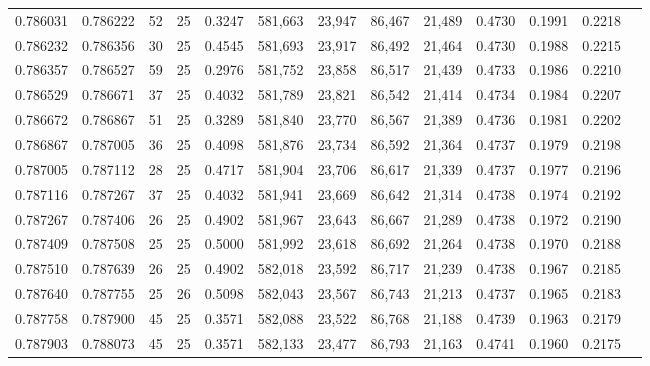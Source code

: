 \begin{tabular}{rrrrrrrrrrrrr}
0.786031 & 0.786222 &    52 &  25 &                                     0.3247 & 581,663 &  23,947 &  86,467 &  21,489 & 0.4730 & 0.1991 & 0.2218 \\
0.786232 & 0.786356 &    30 &  25 &                                     0.4545 & 581,693 &  23,917 &  86,492 &  21,464 & 0.4730 & 0.1988 & 0.2215 \\
0.786357 & 0.786527 &    59 &  25 &                                     0.2976 & 581,752 &  23,858 &  86,517 &  21,439 & 0.4733 & 0.1986 & 0.2210 \\
0.786529 & 0.786671 &    37 &  25 &                                     0.4032 & 581,789 &  23,821 &  86,542 &  21,414 & 0.4734 & 0.1984 & 0.2207 \\
0.786672 & 0.786867 &    51 &  25 &                                     0.3289 & 581,840 &  23,770 &  86,567 &  21,389 & 0.4736 & 0.1981 & 0.2202 \\
0.786867 & 0.787005 &    36 &  25 &                                     0.4098 & 581,876 &  23,734 &  86,592 &  21,364 & 0.4737 & 0.1979 & 0.2198 \\
0.787005 & 0.787112 &    28 &  25 &                                     0.4717 & 581,904 &  23,706 &  86,617 &  21,339 & 0.4737 & 0.1977 & 0.2196 \\
0.787116 & 0.787267 &    37 &  25 &                                     0.4032 & 581,941 &  23,669 &  86,642 &  21,314 & 0.4738 & 0.1974 & 0.2192 \\
0.787267 & 0.787406 &    26 &  25 &                                     0.4902 & 581,967 &  23,643 &  86,667 &  21,289 & 0.4738 & 0.1972 & 0.2190 \\
0.787409 & 0.787508 &    25 &  25 &                                     0.5000 & 581,992 &  23,618 &  86,692 &  21,264 & 0.4738 & 0.1970 & 0.2188 \\
0.787510 & 0.787639 &    26 &  25 &                                     0.4902 & 582,018 &  23,592 &  86,717 &  21,239 & 0.4738 & 0.1967 & 0.2185 \\
0.787640 & 0.787755 &    25 &  26 &                                     0.5098 & 582,043 &  23,567 &  86,743 &  21,213 & 0.4737 & 0.1965 & 0.2183 \\
0.787758 & 0.787900 &    45 &  25 &                                     0.3571 & 582,088 &  23,522 &  86,768 &  21,188 & 0.4739 & 0.1963 & 0.2179 \\
0.787903 & 0.788073 &    45 &  25 &                                     0.3571 & 582,133 &  23,477 &  86,793 &  21,163 & 0.4741 & 0.1960 & 0.2175 \\

\end{tabular}
